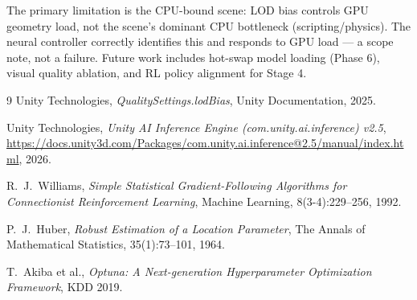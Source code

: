 \documentclass[12pt, a4paper]{article}
\begin{document}
The primary limitation is the CPU-bound scene: LOD bias controls GPU geometry
load, not the scene's dominant CPU bottleneck (scripting/physics). The neural
controller correctly identifies this and responds to GPU load — a scope note,
not a failure. Future work includes hot-swap model loading (Phase 6), visual
quality ablation, and RL policy alignment for Stage 4.

\begin{thebibliography}{9}
    Unity Technologies,
    \textit{QualitySettings.lodBias},
    Unity Documentation, 2025.

    Unity Technologies,
    \textit{Unity AI Inference Engine (com.unity.ai.inference) v2.5},
    \url{https://docs.unity3d.com/Packages/com.unity.ai.inference@2.5/manual/index.html},
    2026.

    R.\ J.\ Williams,
    \textit{Simple Statistical Gradient-Following Algorithms for Connectionist
      Reinforcement Learning},
    Machine Learning, 8(3-4):229--256, 1992.

    P.\ J.\ Huber,
    \textit{Robust Estimation of a Location Parameter},
    The Annals of Mathematical Statistics, 35(1):73--101, 1964.

    T.\ Akiba et al.,
    \textit{Optuna: A Next-generation Hyperparameter Optimization Framework},
    KDD 2019.
\end{thebibliography}
\end{document}
